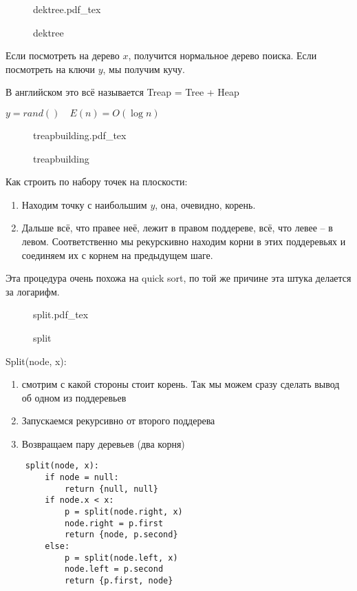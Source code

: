 \documentclass{book}
\theoremstyle{definition}
\newcommand{\incfig}[1]{%
    \def\svgwidth{\columnwidth}
    {#1.pdf_tex}
}
\begin{document}
\begin{figure}[!ht]
    \centering
    \incfig{dektree}
    \caption{dektree}
    \label{fig:dektree}
\end{figure}

Если посмотреть на дерево $x$, получится нормальное дерево поиска. Если посмотреть на ключи  $y$, мы получим кучу.

В английском это всё называется Treap = Tree + Heap

$y = rand\left(  \right) \quad E(n) = O\left( \log n \right) $


\begin{figure}[!ht]
    \centering
    \incfig{treapbuilding}
    \caption{treapbuilding}
    \label{fig:treapbuilding}
\end{figure}

Как строить по набору точек на плоскости:
\begin{enumerate}
    \item Находим точку с наибольшим $y$, она, очевидно, корень. 
    \item Дальше всё, что правее неё, лежит в правом поддереве, всё, что левее -- в левом. Соответственно мы рекурскивно находим корни в этих поддеревьях и соединяем их с корнем на предыдущем шаге.
\end{enumerate}

Эта процедура очень похожа на quick sort, по той же причине эта штука делается за логарифм.

\begin{figure}[!ht]
    \centering
    \incfig{split}
    \caption{split}
    \label{fig:split}
\end{figure}

Split(node, x):
\begin{enumerate}
    \item смотрим с какой стороны стоит корень. Так мы можем сразу сделать вывод об одном из поддеревьев
    \item Запускаемся рекурсивно от второго поддерева
    \item Возвращаем пару деревьев (два корня)
\end{enumerate}

\begin{lstlisting}
    split(node, x):
        if node = null:
            return {null, null}
        if node.x < x:
            p = split(node.right, x)
            node.right = p.first
            return {node, p.second}
        else:
            p = split(node.left, x)
            node.left = p.second
            return {p.first, node}
\end{lstlisting}
\end{document}

